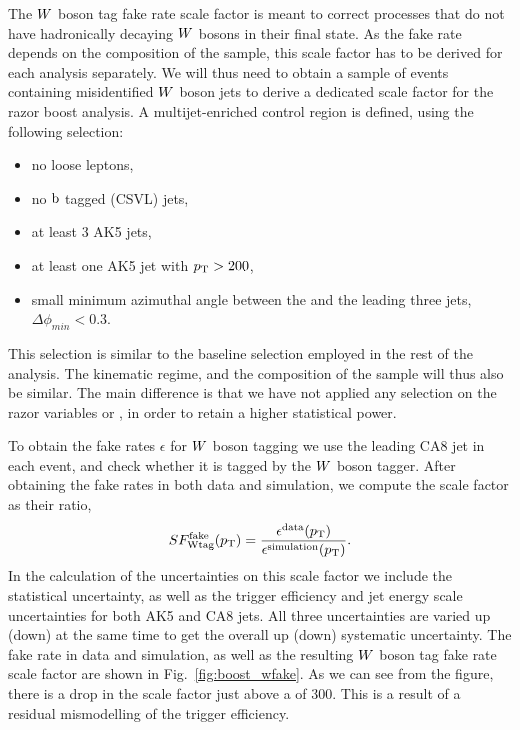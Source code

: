 The $W$ boson tag fake rate scale factor is meant to correct processes that do not have
hadronically decaying $W$ bosons in their final state. As the fake rate depends on the composition
of the sample, this scale factor has to be derived for each analysis separately. 
We will thus need to obtain a sample of events containing misidentified $W$ boson jets to derive a
dedicated scale factor for the razor boost analysis. A multijet-enriched control region is defined,
using the following selection:
\begin{itemize}
\item no loose leptons, 
\item no $\mathrm{b}$ tagged (CSVL) jets,
\item at least 3 AK5 jets,
\item at least one AK5 jet with $p_{\mathrm{T}}>200$\GeV,
\item small minimum azimuthal angle between the \VEtmiss and the leading three jets, \\
$\Delta\phi_{min} < 0.3$.
\end{itemize}
This selection is similar to the baseline selection employed in the rest of the analysis. The
kinematic regime, and the composition of the sample will thus also be similar. The main difference
is that we have not applied any selection on the razor variables \mr or \rsq, in order to retain a
higher statistical power. 

To obtain the fake rates $\epsilon$ for $W$ boson tagging we use the leading CA8 jet in each
event, and check whether it is tagged by the $W$ boson tagger. After obtaining the
fake rates in both data and simulation, we compute the scale factor as their ratio,
\begin{equation}
SF_\textrm{Wtag}^\textrm{fake}(p_{\mathrm{T}}) =
\frac{\epsilon^{\textrm{data}}(p_{\mathrm{T}})}{\epsilon^{\textrm{simulation}}(p_{\mathrm{T}})}.
\end{equation} 
In the calculation of the uncertainties on this scale factor we include the statistical uncertainty,
as well as the trigger efficiency and jet energy scale uncertainties for both AK5 and CA8 jets. 
All three uncertainties are varied up (down) at the same time to get the overall up (down)
systematic  uncertainty.
The fake rate in data and simulation, as well as the resulting $W$ boson tag fake rate scale factor
are shown in Fig.~\ref{fig:boost_wfake}. As we can see from the figure, there is a drop in the scale
factor just above a \pt of 300\GeV. This is a result of a residual mismodelling of the trigger
efficiency. 

